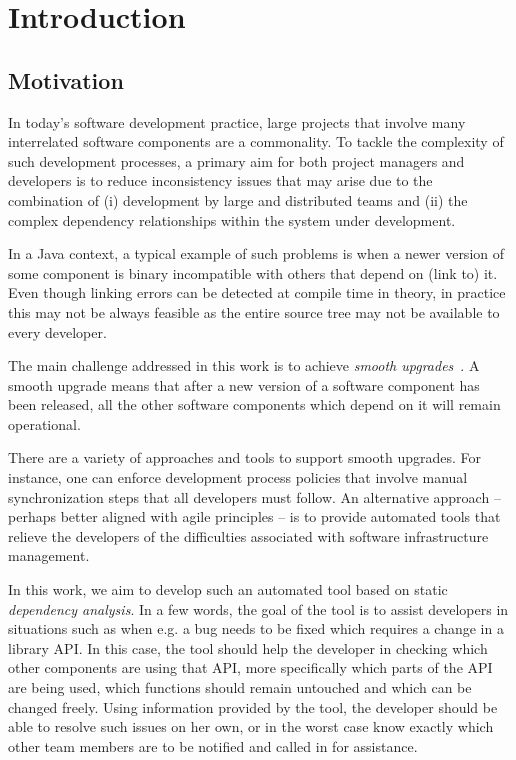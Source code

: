\chapter{Introduction}

\section{Motivation}

In today's software development practice, large projects that involve many
interrelated software components are a commonality. To tackle the complexity of
such development processes, a primary aim for both project managers and
developers is to reduce inconsistency issues that may arise due to the
combination of (i) development by large and distributed teams and (ii) the
complex dependency relationships within the system under development.

In a Java context, a typical example of such problems is when a newer
version of some component is binary incompatible with others that depend on
(link to) it. Even though linking errors can be detected at compile time in
theory, in practice this may not be always feasible as the entire source tree
may not be available to every developer.

The main challenge addressed in this work is to achieve \emph{smooth upgrades}~\cite{Ical11}.
A smooth upgrade means that after a new version of a software component has been
released, all the other software components which depend on it will remain
operational.

There are a variety of approaches and tools to support smooth upgrades. For
instance, one can enforce development process policies that involve manual
synchronization steps that all developers must follow. An alternative approach
-- perhaps better aligned with agile principles -- is to provide automated tools that
relieve the developers of the difficulties associated with software
infrastructure management.

In this work, we aim to develop such an automated tool based on static
\emph{dependency analysis}. In a few words, the goal of the tool is to assist
developers in situations such as when e.g. a bug needs to be fixed which
requires a change in a library API.
In this case, the tool should help the developer in checking which other
components are using that API, more specifically which parts of the API are
being used, which functions should remain untouched and which can be changed
freely. Using information provided by the tool, the developer should be able to
resolve such issues on her own, or in the worst case know exactly which other
team members are to be notified and called in for assistance.
 
